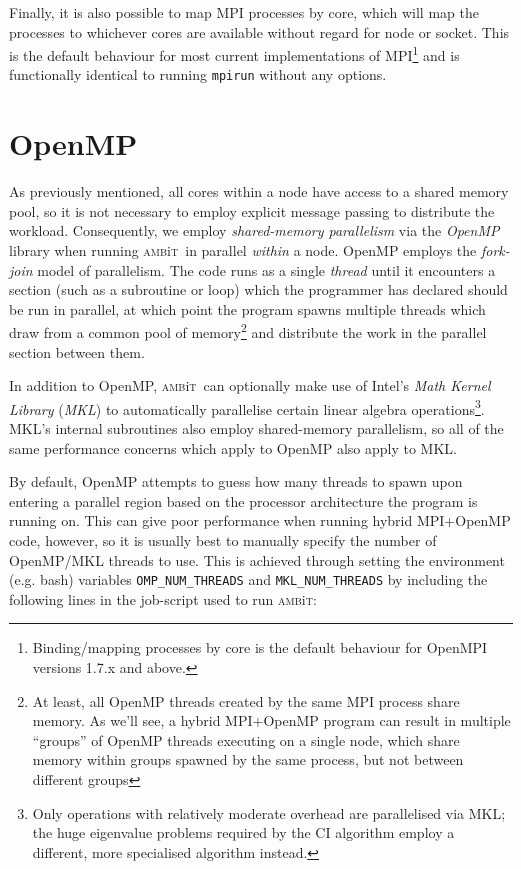 \documentclass{report}
\newcommand{\ambit}{\textsc{amb}{\footnotesize i}\textsc{t}}
\begin{document}
Finally, it is also possible to map MPI processes by core, which will map the processes to whichever
cores are available without regard for node or socket. This is the default behaviour for most
current implementations of MPI\footnote{Binding/mapping processes by core is the default behaviour for
OpenMPI versions 1.7.x and above.} and is functionally identical to running \texttt{mpirun} without any
options.

\section{OpenMP}
\label{sec:OpenMP}
As previously mentioned, all cores within a node have access to a shared memory pool, so it is not
necessary to employ explicit message passing to distribute the workload. Consequently, we employ
\textit{shared-memory parallelism} via the \textit{OpenMP} library when running \ambit\ in parallel
\emph{within} a node. OpenMP employs the \textit{fork-join} model of parallelism. The code runs as a 
single \textit{thread} until it encounters a section (such as a subroutine or loop) which the programmer 
has declared should be run in parallel, at which point the program spawns multiple threads
which draw from a common pool of memory\footnote{At least, all OpenMP threads created by the same MPI 
process share memory. As we'll see, a hybrid MPI+OpenMP program can result in multiple ``groups'' of 
OpenMP threads executing on a single node, which share memory within groups spawned by the same process, 
but not between different groups} and distribute the work in the parallel section between them. 

In addition to OpenMP, \ambit\ can optionally make use of Intel's \textit{Math Kernel Library} 
(\textit{MKL}) to automatically parallelise certain linear algebra operations\footnote{Only operations 
with relatively moderate overhead are parallelised via MKL; the huge eigenvalue problems required by the
CI algorithm employ a different, more specialised algorithm instead.}. MKL's internal subroutines also
employ shared-memory parallelism, so all of the same performance concerns which apply to OpenMP also
apply to MKL.

By default, OpenMP attempts to guess how many threads to spawn upon entering a parallel region based on
the processor architecture the program is running on. This can give poor performance when running hybrid
MPI+OpenMP code, however, so it is usually best to manually specify the number of OpenMP/MKL threads to
use. This is achieved through setting the environment (e.g. bash) variables \texttt{OMP\_NUM\_THREADS} 
and \texttt{MKL\_NUM\_THREADS} by including the following lines in the job-script used to run \ambit:
\end{document}

